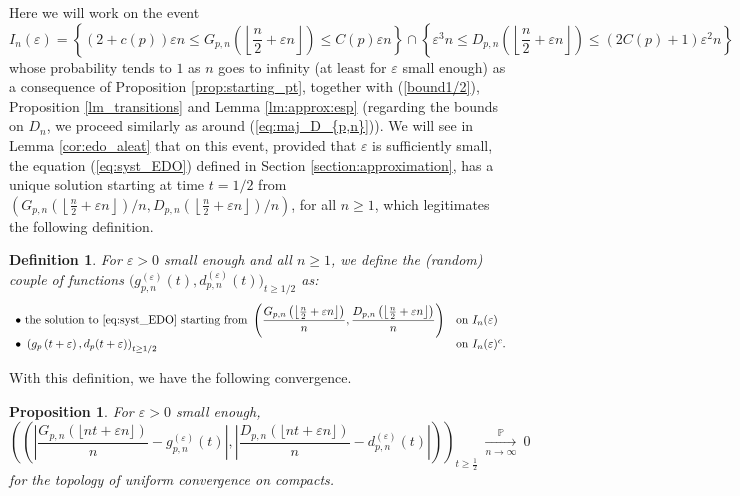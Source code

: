 \documentclass[a4, 11pt]{article}
\numberwithin{equation}{section}
\theoremstyle{plain}
\newtheorem{proposition}[theorem]{Proposition}
\newtheorem{definition}[theorem]{Definition}
\theoremstyle{definition}
\theoremstyle{remark}
\begin{document}
Here we will work on the event 
\begin{equation}\label{def:I_n(epsilon)}
I_n(\varepsilon)=\left\{(2+c(p))\varepsilon n\leq G_{p,n}\left(\left\lfloor\frac{n}{2}+\varepsilon n\right\rfloor\right) \leq C(p)\varepsilon n \right\}\cap \left\{\varepsilon^3n\leq D_{p,n}\left(\left\lfloor\frac{n}{2}+\varepsilon n\right\rfloor\right)\leq (2C(p)+1)\varepsilon^2 n \right\}
\end{equation}
whose probability tends to $1$ as $n$ goes to infinity (at least for $\varepsilon$ small enough) as a consequence of Proposition \ref{prop:starting_pt}, together with (\ref{bound1/2}), Proposition \ref{lm_transitions} and Lemma \ref{lm:approx:esp} (regarding the bounds on $D_n$, we proceed similarly as around (\ref{eq:maj_D_{p,n}})). We will see in Lemma \ref{cor:edo_aleat} that on this event, provided that $\varepsilon$ is sufficiently small, the equation (\ref{eq:syst_EDO}) defined in Section \ref{section:approximation}, has a unique solution starting at time $t=1/2$ from  $\left(G_{p,n}\left(\left\lfloor\frac{n}{2}+\varepsilon n\right\rfloor\right)/n,D_{p,n}\left(\left\lfloor\frac{n}{2}+\varepsilon n\right\rfloor\right)/n\right)$, for all $n \geq 1$, which legitimates the following definition. 
 
\begin{definition}\label{def:f_nd_n_epsilon}
	For $\varepsilon>0$ small enough and all $n\geq 1$, we define the (random) couple of  functions $\big(g_{p,n}^{(\varepsilon)}(t),d_{p,n}^{(\varepsilon)}(t)\big)_{t\geq 1/2}$ as:
	\vspace{-0.3cm}
	$$\begin{array}{ll}
		\bullet \text{ the solution to \eqref{eq:syst_EDO} starting from } \displaystyle\left(\frac{G_{p,n}\left(\left\lfloor\frac{n}{2}+\varepsilon n\right\rfloor\right)}{n}, \frac{D_{p,n}\left(\left\lfloor\frac{n}{2}+\varepsilon n\right\rfloor\right)}{n}\right) & \text{on }I_n(\varepsilon)\\
		\bullet ~\left(g_p\left(t+\varepsilon\right),d_p(t+\varepsilon)\right)_{t\geq 1/2} &\text{on } I_n(\varepsilon)^c.
	\end{array}$$
\end{definition}

With this definition, we have the following convergence.
\begin{proposition}\label{prop:DEM}
For $\varepsilon>0$ small enough, 	
$$\left(\left(\left\lvert \frac{G_{p,n}\left(\lfloor nt+\varepsilon n\rfloor\right)}{n}-g_{p,n}^{(\varepsilon)}(t) \right\vert, \left\lvert \frac{D_{p,n}\left(\lfloor nt+\varepsilon n\rfloor\right)}{n}-d_{p,n}^{(\varepsilon)}(t) \right\vert \right)\right)_{t\geq \frac{1}{2}}~\underset{n \rightarrow \infty }{\overset{\mathbb{P}}{\longrightarrow}}~0$$	
for the topology of uniform convergence on compacts.
\end{proposition}
\end{document}
